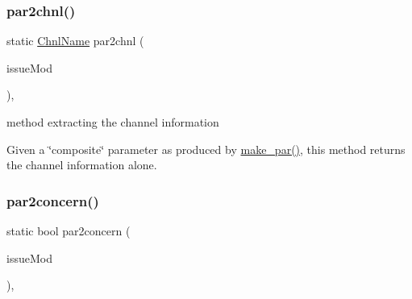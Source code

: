 \mbox{\label{class_s_m_spp__di__unipi__it_1_1_observer_a7a9f17ec911566406a89c0cd8d61eb2b}} 
\subsubsection{\texorpdfstring{par2chnl()}{par2chnl()}}
{\footnotesize\ttfamily static \mbox{\hyperlink{class_s_m_spp__di__unipi__it_1_1_observer_a54ce8db639626e45b1f20c289baa989b}{Chnl\+Name}} par2chnl (\begin{DoxyParamCaption}\item[{\mbox{\hyperlink{group___modification___t_y_p_e_s_ga544246d8c462e9a2d817c2c30797968f}{c\+\_\+\+Mod\+Param}}}]{issue\+Mod }\end{DoxyParamCaption})\hspace{0.3cm}{\ttfamily [inline]}, {\ttfamily [static]}}



method extracting the channel information 

Given a \char`\"{}composite\char`\"{} parameter as produced by \mbox{\hyperlink{class_s_m_spp__di__unipi__it_1_1_observer_a2d499ae38e5e95cf66cd71da32b0694a}{make\+\_\+par()}}, this method returns the channel information alone. \mbox{\label{class_s_m_spp__di__unipi__it_1_1_observer_afaaba53338fc993962a65c76cd33c65c}} 
\subsubsection{\texorpdfstring{par2concern()}{par2concern()}}
{\footnotesize\ttfamily static bool par2concern (\begin{DoxyParamCaption}\item[{\mbox{\hyperlink{group___modification___t_y_p_e_s_ga544246d8c462e9a2d817c2c30797968f}{c\+\_\+\+Mod\+Param}}}]{issue\+Mod }\end{DoxyParamCaption})\hspace{0.3cm}{\ttfamily [inline]}, {\ttfamily [static]}}



